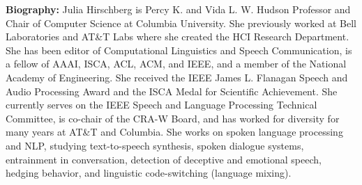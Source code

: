 \vspace{3em}\par 

\vfill
\noindent

{\bfseries Biography:} Julia Hirschberg is Percy K. and Vida L. W. Hudson Professor and Chair of Computer Science at Columbia University. She previously worked at Bell Laboratories and AT\&T Labs where she created the HCI Research Department. She has been editor of Computational Linguistics and Speech Communication, is a fellow of AAAI, ISCA, ACL, ACM, and IEEE, and a member of the National Academy of Engineering. She received the IEEE James L. Flanagan Speech and Audio Processing Award and the ISCA Medal for Scientific Achievement. She currently serves on the IEEE Speech and Language Processing Technical Committee, is co-chair of the CRA-W Board, and has worked for diversity for many years at AT\&T and Columbia. She works on spoken language processing and NLP, studying text-to-speech synthesis, spoken dialogue systems, entrainment in conversation, detection of deceptive and emotional speech, hedging behavior, and linguistic code-switching (language mixing).
\newpage
